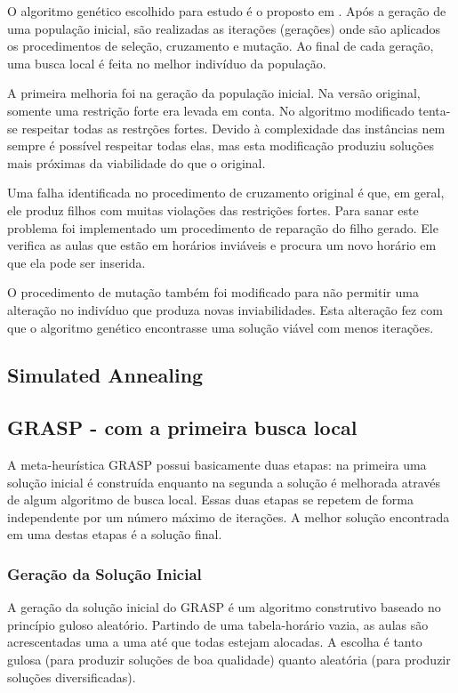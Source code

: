\documentclass[11pt]{article}
\begin{document}
O algoritmo genético escolhido para estudo é o proposto em \cite{massoodian2008}. Após a geração de uma população inicial, são realizadas as iterações (gerações) onde são aplicados os procedimentos de seleção, cruzamento e mutação. Ao final de cada geração, uma busca local é feita no melhor indivíduo da população.

A primeira melhoria foi na geração da população inicial. Na versão original, somente uma restrição forte era levada em conta. No algoritmo modificado tenta-se respeitar todas as restrções fortes. Devido à complexidade das instâncias nem sempre é possível respeitar todas elas, mas esta modificação produziu soluções mais próximas da viabilidade do que o original.

Uma falha identificada no procedimento de cruzamento original é que, em geral, ele produz filhos com muitas violações das restrições fortes. Para sanar este problema foi implementado um procedimento de reparação do filho gerado. Ele verifica as aulas que estão em horários inviáveis e procura um novo horário em que ela pode ser inserida.

O procedimento de mutação também foi modificado para não permitir uma alteração no indivíduo que produza novas inviabilidades. Esta alteração fez com que o algoritmo genético encontrasse uma solução viável com menos iterações.

\subsection{Simulated Annealing}

\subsection{GRASP - com a primeira busca local}

A meta-heurística GRASP \cite{grasp_resende_ribeiro} possui basicamente duas etapas: na primeira uma solução inicial é construída enquanto na segunda a solução é melhorada através de algum algoritmo de busca local. Essas duas etapas se repetem de forma independente por um número máximo de iterações. A melhor solução encontrada em uma destas etapas é a solução final.

\subsubsection{Geração da Solução Inicial}

A geração da solução inicial do GRASP é um algoritmo construtivo baseado no princípio guloso aleatório. Partindo de uma tabela-horário vazia, as aulas são acrescentadas uma a uma até que todas estejam alocadas. A escolha é tanto gulosa (para produzir soluções de boa qualidade) quanto aleatória (para produzir soluções diversificadas).
\end{document}
